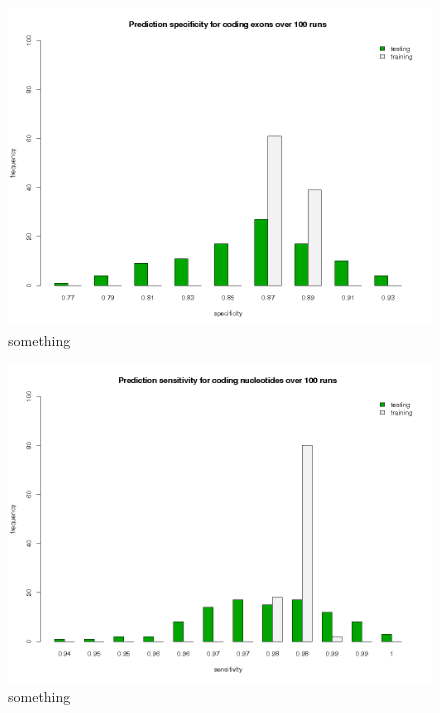 \begin{figure}[ht]
	\begin{center}
		\includegraphics[scale=0.42]{pics/codingExons_spec.png}
	\caption{something}
	\end{center}
	\label{fig:stateAgreement}
\end{figure}

\begin{figure}[ht]
	\begin{center}
		\includegraphics[scale=0.42]{pics/codingNucleotides_sens.png}
	\caption{something}
	\end{center}
	\label{fig:stateAgreement}
\end{figure}

